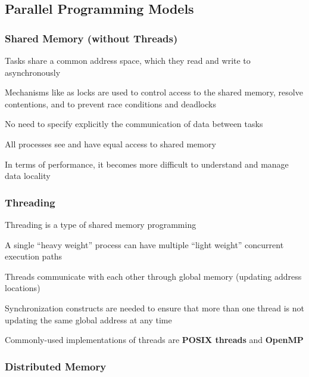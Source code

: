 \documentclass[12pt]{article}
\begin{document}
\pagebreak
\subsection*{Parallel Programming Models}

\subsubsection*{Shared Memory (without Threads)}

\begin{compactitem}
\item Tasks share a common address space, which they read and write to
      asynchronously
\item Mechanisms like as locks are used to control access to the shared memory,
      resolve contentions, and to prevent race conditions and deadlocks
\item No need to specify explicitly the communication of data between tasks
\item All processes see and have equal access to shared memory
\item In terms of performance, it becomes more difficult to understand and 
      manage data locality
\end{compactitem}

\subsubsection*{Threading}

\begin{compactitem}
\item Threading is a type of shared memory programming
\item A single ``heavy weight'' process can have multiple ``light weight''
      concurrent execution paths
\item Threads communicate with each other through global memory (updating
      address locations)
\item Synchronization constructs are needed to ensure that more than one thread
      is not updating the same global address at any time
\item Commonly-used implementations of threads are \textbf{POSIX threads} and 
      \textbf{OpenMP}
\end{compactitem}

\subsubsection*{Distributed Memory}
\end{document}
